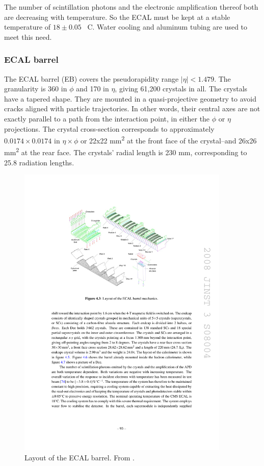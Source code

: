 The number of scintillation photons and the electronic amplification thereof both are decreasing with temperature. 
So the ECAL must be kept at a stable temperature of $18\pm0.05$\textdegree~ C.
Water cooling and aluminum tubing are used to meet this need.

\subsubsection{ECAL barrel}
The ECAL barrel (EB) covers the pseudorapidity range $|\eta|<1.479$.
The granularity is 360 in $\phi$ and 170 in $\eta$, giving 61,200 crystals in all.
The crystals have a tapered shape.
They are mounted in a quasi-projective geometry to avoid cracks aligned with particle trajectories.
In other words, their central axes are not exactly parallel to a path from the interaction point, 
in either the $\phi$ or $\eta$ projections.
The crystal cross-section corresponds to approximately $0.0174 \times 0.0174$ in $\eta\times\phi$
or 22x22 mm\textsuperscript{2} at the front face of the crystal--and 26x26 mm\textsuperscript{2}
at the rear face.
The crystals' radial length is 230 mm, corresponding to 25.8 radiation lengths.

\begin{figure}
\centering
\includegraphics[width=0.9\textwidth]{figures/ecal_barrel.pdf}
\caption{Layout of the ECAL barrel. From \cite{Chatrchyan:2008aa}.}
\label{fig:ecal_barrel}
\end{figure}

